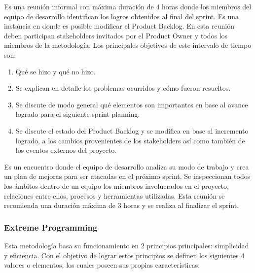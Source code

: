 \begin{description}[leftmargin=10em,style=nextline]
  \item[4. \textit{Sprint Review}] Es una reunión informal con máxima duración de 4 horas donde los miembros del equipo de desarrollo identifican los logros obtenidos al final del sprint. Es una instancia en donde es posible modificar el Product Backlog. En esta reunión deben participan  stakeholders invitados por el Product Owner y todos los miembros de la metodología. Los principales objetivos de este intervalo de tiempo son:
    \begin{enumerate}
      \item Qué se hizo y qué no hizo.
      \item Se explican en detalle los problemas ocurridos y cómo fueron resueltos.
      \item Se discute de modo general qué elementos son importantes en base al avance logrado para el siguiente sprint planning.
      \item Se discute el estado del Product Backlog y se modifica en base al incremento logrado, a los cambios provenientes de los stakeholders así como también de los eventos externos del proyecto.
    \end{enumerate}

  \item[5. \textit{Sprint Retrospective}] Es un encuentro donde el equipo de desarrollo analiza su modo de trabajo y crea un plan de mejoras para ser atacadas en el próximo sprint. Se inspeccionan todos los ámbitos dentro de un equipo los miembros involucrados en el proyecto, relaciones entre ellos, procesos y herramientas utilizadas. Esta reunión se recomienda una duración máxima de 3 horas y se realiza al finalizar el sprint.
\end{description}

\subsubsection{Extreme Programming \label{sec:extreme_programming}}
Esta metodología basa su funcionamiento en 2 principios principales: simplicidad y eficiencia. Con el objetivo de lograr estos principios se definen los siguientes 4 valores o elementos, los cuales poseen sus propias características:

